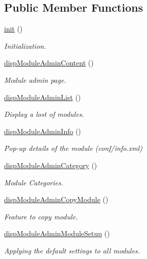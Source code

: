 \subsection*{Public Member Functions}
\begin{DoxyCompactItemize}
\item 
\hyperlink{classmoduleAdminView_a9b5d1a3f7dc566edd3c5f381e19438b7}{init} ()
\begin{DoxyCompactList}\small\item\em Initialization. \end{DoxyCompactList}\item 
\hyperlink{classmoduleAdminView_a1b5edba3a516dd443b323743330ded45}{disp\+Module\+Admin\+Content} ()
\begin{DoxyCompactList}\small\item\em Module admin page. \end{DoxyCompactList}\item 
\hyperlink{classmoduleAdminView_a9fcb82dc32bc423eda912b34d0cabd00}{disp\+Module\+Admin\+List} ()
\begin{DoxyCompactList}\small\item\em Display a lost of modules. \end{DoxyCompactList}\item 
\hyperlink{classmoduleAdminView_abb4989ee97d80a1f9a04a3f8364807c0}{disp\+Module\+Admin\+Info} ()
\begin{DoxyCompactList}\small\item\em Pop-\/up details of the module (conf/info.\+xml) \end{DoxyCompactList}\item 
\hyperlink{classmoduleAdminView_a1e6312f7a841064603ba51ad835f4e28}{disp\+Module\+Admin\+Category} ()
\begin{DoxyCompactList}\small\item\em Module Categories. \end{DoxyCompactList}\item 
\hyperlink{classmoduleAdminView_aa9846c36dd6d640677eb6c9ac237e28f}{disp\+Module\+Admin\+Copy\+Module} ()
\begin{DoxyCompactList}\small\item\em Feature to copy module. \end{DoxyCompactList}\item 
\hyperlink{classmoduleAdminView_a3af1bd27e1da3bc8e31815d109a476da}{disp\+Module\+Admin\+Module\+Setup} ()
\begin{DoxyCompactList}\small\item\em Applying the default settings to all modules. \end{DoxyCompactList}\item 

\end{DoxyCompactItemize}
